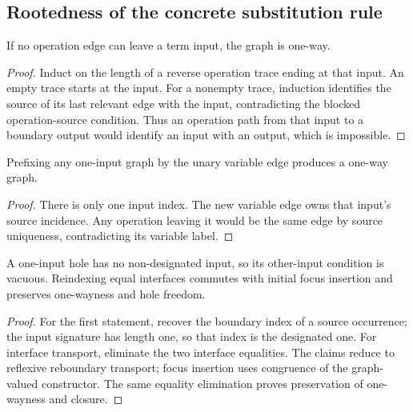 \subsection{Rootedness of the concrete substitution rule}

\begin{lemma}
If no operation edge can leave a term input, the graph is one-way.
\end{lemma}
\begin{proof}
Induct on the length of a reverse operation trace ending at that input. An
empty trace starts at the input. For a nonempty trace, induction identifies
the source of its last relevant edge with the input, contradicting the blocked
operation-source condition. Thus an operation path from that input to a
boundary output would identify an input with an output, which is impossible.
\end{proof}
\begin{corollary}
Prefixing any one-input graph by the unary variable edge produces a one-way graph.
\end{corollary}
\begin{proof}
There is only one input index. The new variable edge owns that input's source
incidence. Any operation leaving it would be the same edge by source
uniqueness, contradicting its variable label.
\end{proof}


\begin{lemma}
A one-input hole has no non-designated input, so its other-input condition is
vacuous. Reindexing equal interfaces commutes with initial focus insertion
and preserves one-wayness and hole freedom.
\end{lemma}
\begin{proof}
For the first statement, recover the boundary index of a source occurrence;
the input signature has length one, so that index is the designated one.
For interface transport, eliminate the two interface equalities. The claims
reduce to reflexive reboundary transport; focus insertion uses congruence of
the graph-valued constructor. The same equality elimination proves preservation
of one-wayness and closure.
\end{proof}


